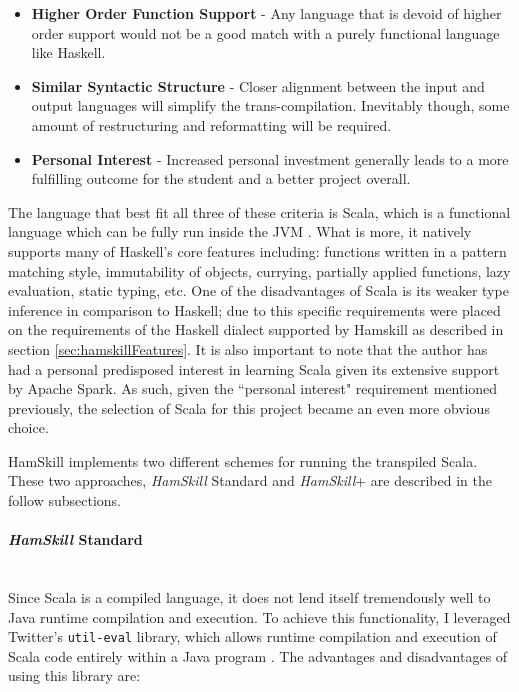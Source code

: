 \documentclass{report}
\newcommand{\myparagraph}[1]{\paragraph{#1}\mbox{}\\}
\begin{document}
\begin{itemize}

	\item \textbf{Higher Order Function Support} - Any language that is devoid of higher order support would not be a good match with a purely functional language like Haskell.
	
	\item \textbf{Similar Syntactic Structure} - Closer alignment between the input and output languages will simplify the trans-compilation.  Inevitably though, some amount of restructuring and reformatting will be required.  
	
	\item \textbf{Personal Interest} - Increased personal investment generally leads to a more fulfilling outcome for the student and a better project overall.  

\end{itemize}

The language that best fit all three of these criteria is Scala, which is a functional language which can be fully run inside the JVM \cite{whatIsScala}. What is more, it natively supports many of Haskell's core features including: functions written in a pattern matching style, immutability of objects, currying, partially applied functions, lazy evaluation, static typing, etc.  One of the disadvantages of Scala is its weaker type inference in comparison to Haskell; due to this specific requirements were placed on the requirements of the Haskell dialect supported by Hamskill as described in section \ref{sec:hamskillFeatures}.  It is also important to note that the author has had a personal predisposed interest in learning Scala given its extensive support by Apache Spark.  As such, given the ``personal interest" requirement mentioned previously, the selection of Scala for this project became an even more obvious choice.

HamSkill implements two different schemes for running the transpiled Scala.  These two approaches, \textit{HamSkill} Standard and \textit{HamSkill}+ are described in the follow subsections.

\myparagraph{\textit{HamSkill} Standard}

Since Scala is a compiled language, it does not lend itself tremendously well to Java runtime compilation and execution.  To achieve this functionality, I leveraged Twitter's \texttt{util-eval} library, which allows runtime compilation and execution of Scala code entirely within a Java program \cite{githubTwitterEvalUtil}.  The advantages and disadvantages of using  this library are:
\end{document}
